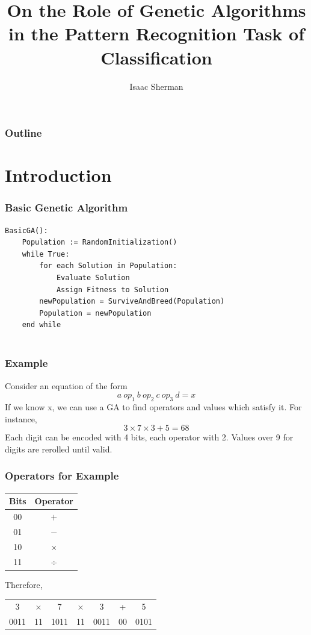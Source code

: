 \documentclass{beamer}
\title[Genetic Algorithms in Classification]{On the Role of Genetic Algorithms in the Pattern Recognition Task of Classification}
\author{Isaac Sherman}
\institute{Electrical Engineering and Computer Science}
\begin{document}
\begin{frame}
\titlepage
\end{frame}

\begin{frame}
	\frametitle{Outline}
	\tableofcontents
\end{frame}

\section{Introduction}
\begin{frame}[fragile]
\frametitle{Basic Genetic Algorithm}
\begin{lstlisting}[language = algorithm, basicstyle=\scriptsize]
BasicGA():
	Population := RandomInitialization()
	while True:
		for each Solution in Population:
			Evaluate Solution
			Assign Fitness to Solution
		newPopulation = SurviveAndBreed(Population)
		Population = newPopulation
	end while
	
	\end{lstlisting}
\end{frame}

\begin{frame}
	\frametitle{Example}
	Consider an equation of the form $$		a \: op_1\: b\: op_2\: c\: op_3\: d =x$$
	If we know x, we can use a GA to find operators and values which satisfy it.  For instance, 
	$$		3 \times 7 \times 3 + 5 = 68$$
	Each digit can be encoded with 4 bits, each operator with 2.  Values over 9 for digits are rerolled until valid.
\end{frame}
\begin{frame}[fragile]
	
	\frametitle{Operators for Example}
	\begin{tabular}{|c| c|}\hline
	Bits & Operator\\
	\hline
	00&$+$\\
	01&$-$\\
	10&$\times$\\
	11&$\div$\\
	\hline
\end{tabular}

Therefore, \\

\begin{tabular}{c c c c c c c}
	3& $\times$& 7& $\times$& 3& +& 5\\
	0011&11&1011&11&0011&00&0101\\
\end{tabular}
\end{frame}
\end{document}
